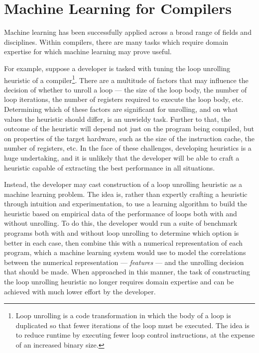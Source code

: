 \section{Machine Learning for Compilers}

Machine learning has been successfully applied across a broad range of fields and disciplines. Within compilers, there are many tasks which require domain expertise for which machine learning may prove useful.

For example, suppose a developer is tasked with tuning the loop unrolling heuristic of a compiler\footnote{Loop unrolling is a code transformation in which the body of a loop is duplicated so that fewer iterations of the loop must be executed. The idea is to reduce runtime by executing fewer loop control instructions, at the expense of an increased binary size.}. There are a multitude of factors that may influence the decision of whether to unroll a loop --- the size of the loop body, the number of loop iterations, the number of registers required to execute the loop body, etc. Determining which of these factors are significant for unrolling, and on what values the heuristic should differ, is an unwieldy task. Further to that, the outcome of the heuristic will depend not just on the program being compiled, but on properties of the target hardware, such as the size of the instruction cache, the number of registers, etc. In the face of these challenges, developing heuristics is a huge undertaking, and it is unlikely that the developer will be able to craft a heuristic capable of extracting the best performance in all situations.

Instead, the developer may cast construction of a loop unrolling heuristic as a machine learning problem. The idea is, rather than expertly crafting a heuristic through intuition and experimentation, to use a learning algorithm to build the heuristic based on empirical data of the performance of loops both with and without unrolling. To do this, the developer would run a suite of benchmark programs both with and without loop unrolling to determine which option is better in each case, then combine this with a numerical representation of each program, which a machine learning system would use to model the correlations between the numerical representation --- \emph{features} --- and the unrolling decision that should be made. When approached in this manner, the task of constructing the loop unrolling heuristic no longer requires domain expertise and can be achieved with much lower effort by the developer.

